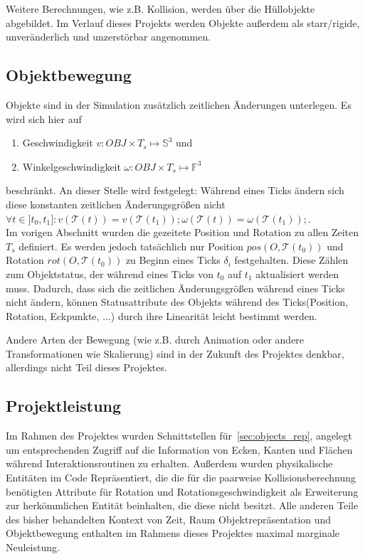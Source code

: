 Weitere Berechnungen, wie z.B. Kollision, werden über die Hüllobjekte abgebildet.
Im Verlauf dieses Projekts werden Objekte außerdem als starr/rigide, unveränderlich und unzerstörbar angenommen.

\subsection{Objektbewegung}
\label{sec:objects_mov}
Objekte sind in der Simulation zusätzlich zeitlichen Änderungen unterlegen. Es wird sich hier auf
\begin{enumerate}
\item Geschwindigkeit $v: OBJ \times T_s \mapsto \mathbb{S}^3$  und
\item Winkelgeschwindigkeit $\omega : OBJ \times T_s \mapsto \mathbb{F}^3 $
\end{enumerate}
beschränkt.
An dieser Stelle wird festgelegt: Während eines Ticks ändern sich diese konstanten zeitlichen Änderungsgrößen nicht $\forall t \in ]t_0, t_1] : v(\mathcal{T}(t)) = v(\mathcal{T}( t_1 )); \omega(\mathcal{T}(t)) = \omega(\mathcal{T}(t_1));$.\\
Im vorigen Abschnitt wurden die gezeitete Position und Rotation zu allen Zeiten $T_s$ definiert.
Es werden jedoch tatsächlich nur Position $pos(O, \mathcal{T}(t_0))$ und Rotation $rot(O, \mathcal{T}(t_0))$ zu Beginn eines Ticks $\delta_i$ festgehalten. Diese Zählen zum Objektstatus, der während eines Ticks von $t_0$ auf $t_1$ aktualisiert werden muss. Dadurch, dass sich die zeitlichen Änderungsgrößen während eines Ticks nicht ändern, können Statusattribute des Objekts während des Ticks(Position, Rotation, Eckpunkte, ...) durch ihre Linearität leicht bestimmt werden.  

Andere Arten der Bewegung (wie z.B. durch Animation oder andere Transformationen wie Skalierung) sind in der Zukunft des Projektes denkbar, allerdings nicht Teil dieses Projektes.

\subsection{Projektleistung}
Im Rahmen des Projektes wurden Schnittstellen für~\ref{sec:objects_rep}, angelegt um entsprechenden Zugriff auf die Information von Ecken, Kanten und Flächen während Interaktionsroutinen zu erhalten. Außerdem wurden physikalische Entitäten im Code Repräsentiert, die die für die paarweise Kollisionsberechnung benötigten Attribute für Rotation und Rotationsgeschwindigkeit als Erweiterung zur herkömmlichen Entität beinhalten, die diese nicht besitzt. Alle anderen Teile des bisher behandelten Kontext von Zeit, Raum Objektrepräsentation und Objektbewegung enthalten im Rahmens dieses Projektes maximal marginale Neuleistung.


